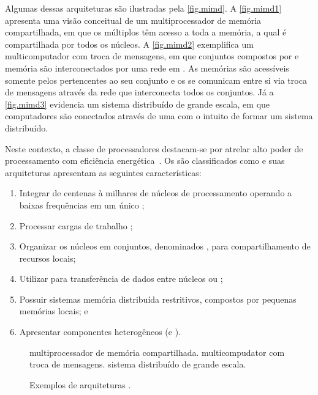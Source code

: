 Algumas dessas arquiteturas são ilustradas pela \autoref{fig.mimd}. A \autoref{fig.mimd1} apresenta uma visão conceitual de um multiprocessador de memória compartilhada, em que os múltiplos \cores têm acesso a toda a memória, a qual é compartilhada por todos os núcleos. A \autoref{fig.mimd2} exemplifica um multicomputador com troca de mensagens, em que conjuntos compostos por \cores e memória são interconectados por uma rede em \chip. As memórias são acessíveis somente pelos \cores pertencentes ao seu conjunto e os \cores se comunicam entre si via troca de mensagens através da rede que interconecta todos os conjuntos. Já a \autoref{fig.mimd3} evidencia um sistema distribuído de grande escala, em que computadores são conectados através de uma \wan com o intuito de formar um sistema distribuído.

Neste contexto, a classe de processadores \lws destacam-se por atrelar alto poder de processamento com eficiência energética~\cite{francesquini2015}. Os \lws são classificados como \mpsoc e suas arquiteturas apresentam as seguintes características:
\begin{enumerate}[label=(\roman*)]
    \item Integrar de centenas à milhares de núcleos de processamento operando a baixas frequências em um único \chip;
    \item Processar cargas de trabalho \mimd;
    \item Organizar os núcleos em conjuntos, denominados \clusters, para compartilhamento de recursos locais;
    \item Utilizar \nocs para transferência de dados entre núcleos ou \clusters;
    \item Possuir sistemas memória distribuída restritivos, compostos por pequenas memórias locais; e
    \item Apresentar componentes heterogêneos (\cclusters e \ioclusters).
\end{enumerate}

\begin{figure}[t]
	\centering
	
    \caption{Exemplos de arquiteturas \mimd.}%
                   {multiprocessador de memória compartilhada.}
                   {}
	\qquad
                   {multicompudator com troca de mensagens.}
                   {}
    \qquad
                   {sistema distribuído de grande escala.}
                   {}

    \label{fig.mimd}
\end{figure}


